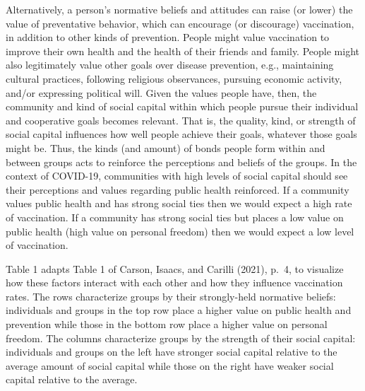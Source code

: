 \documentclass[
]{article}
\begin{document}
Alternatively, a person's normative beliefs and attitudes can raise (or
lower) the value of preventative behavior, which can encourage (or
discourage) vaccination, in addition to other kinds of prevention.
People might value vaccination to improve their own health and the
health of their friends and family. People might also legitimately value
other goals over disease prevention, e.g., maintaining cultural
practices, following religious observances, pursuing economic activity,
and/or expressing political will. Given the values people have, then,
the community and kind of social capital within which people pursue
their individual and cooperative goals becomes relevant. That is, the
quality, kind, or strength of social capital influences how well people
achieve their goals, whatever those goals might be. Thus, the kinds (and
amount) of bonds people form within and between groups acts to reinforce
the perceptions and beliefs of the groups. In the context of COVID-19,
communities with high levels of social capital should see their
perceptions and values regarding public health reinforced. If a
community values public health and has strong social ties then we would
expect a high rate of vaccination. If a community has strong social ties
but places a low value on public health (high value on personal freedom)
then we would expect a low level of vaccination.

Table 1 adapts Table 1 of Carson, Isaacs, and Carilli (2021), p.~4, to
visualize how these factors interact with each other and how they
influence vaccination rates. The rows characterize groups by their
strongly-held normative beliefs: individuals and groups in the top row
place a higher value on public health and prevention while those in the
bottom row place a higher value on personal freedom. The columns
characterize groups by the strength of their social capital: individuals
and groups on the left have stronger social capital relative to the
average amount of social capital while those on the right have weaker
social capital relative to the average.
\end{document}
